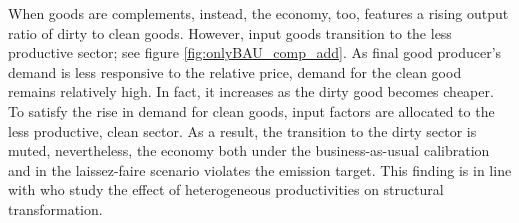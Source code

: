 When goods are complements, instead, the economy, too, features a rising output ratio of dirty to clean goods. However, input goods transition to the less productive sector; see figure \ref{fig:onlyBAU_comp_add}. As final good producer's demand is less responsive to the relative price, demand for the clean good remains relatively high.  In fact, it increases as the dirty good becomes cheaper. To satisfy the rise in demand for clean goods, input factors are allocated to the less productive, clean sector. As a result, the transition to the dirty sector is muted, nevertheless, the economy  both under the business-as-usual calibration and in the laissez-faire scenario violates the emission target. This finding is in line with \cite{Ngai2007StructuralGrowth} who study the effect of heterogeneous productivities on structural transformation.

